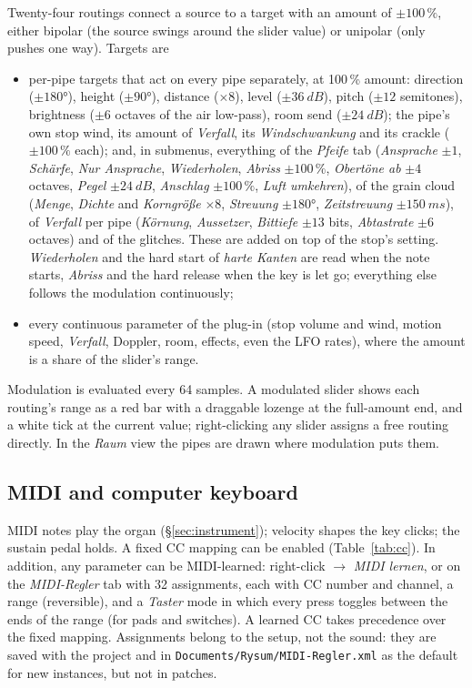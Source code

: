 \documentclass[11pt,a4paper,parskip=half,DIV=11,toc=bibliography]{scrartcl}
\newcommand{\ui}[1]{\emph{#1}}                 %
\newcommand{\fn}[1]{\mbox{\texttt{#1}}}
\begin{document}
Twenty-four routings connect a source to a target with an amount of $\pm100\,\%$, either bipolar
(the source swings around the slider value) or unipolar (only pushes one way). Targets are
\begin{itemize}
  \item per-pipe targets that act on every pipe separately, at 100\,\% amount: direction ($\pm180°$), height
        ($\pm90°$), distance ($\times8$), level ($\pm\SI{36}{dB}$), pitch ($\pm12$ semitones), brightness
        ($\pm6$ octaves of the air low-pass), room send ($\pm\SI{24}{dB}$); the pipe's own stop wind, its amount of
        \ui{Verfall}, its \ui{Windschwankung} and its crackle ($\pm100\,\%$ each); and, in submenus, everything of the
        \ui{Pfeife} tab (\ui{Ansprache} $\pm1$, \ui{Schärfe}, \ui{Nur Ansprache}, \ui{Wiederholen}, \ui{Abriss} $\pm100\,\%$,
        \ui{Obertöne ab} $\pm4$ octaves, \ui{Pegel} $\pm\SI{24}{dB}$, \ui{Anschlag} $\pm100\,\%$, \ui{Luft umkehren}), of the grain
        cloud (\ui{Menge}, \ui{Dichte} and \ui{Korngröße} $\times8$, \ui{Streuung} $\pm180°$, \ui{Zeitstreuung} $\pm\SI{150}{ms}$),
        of \ui{Verfall} per pipe (\ui{Körnung}, \ui{Aussetzer}, \ui{Bittiefe} $\pm13$ bits, \ui{Abtastrate} $\pm6$ octaves) and
        of the glitches. These are added on top of the stop's setting. \ui{Wiederholen} and the hard start of \ui{harte Kanten} are
        read when the note starts, \ui{Abriss} and the hard release when the key is let go; everything else follows the
        modulation continuously;
  \item every continuous parameter of the plug-in (stop volume and wind, motion speed, \ui{Verfall},
        Doppler, room, effects, even the LFO rates), where the amount is a share of the slider's range.
\end{itemize}
Modulation is evaluated every 64 samples. A modulated slider shows each routing's range as a red bar
with a draggable lozenge at the full-amount end, and a white tick at the current value; right-clicking any
slider assigns a free routing directly. In the \ui{Raum} view the pipes are drawn where modulation puts
them.

\subsection{MIDI and computer keyboard}
\label{sec:control}
MIDI notes play the organ (\S\ref{sec:instrument}); velocity shapes the key clicks; the sustain pedal holds.
A fixed CC mapping can be enabled (Table~\ref{tab:cc}). In addition, any parameter can be MIDI-learned:
right-click $\rightarrow$ \ui{MIDI lernen}, or on the \ui{MIDI-Regler} tab with 32 assignments, each with
CC number and channel, a range (reversible), and a \ui{Taster} mode in which every press toggles between
the ends of the range (for pads and switches). A learned CC takes precedence over the fixed mapping.
Assignments belong to the setup, not the sound: they are saved with the project and in
\fn{Documents/Rysum/MIDI-Regler.xml} as the default for new instances, but not in patches.
\end{document}
